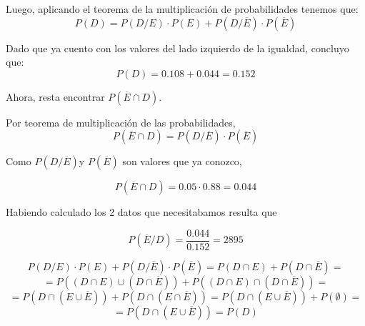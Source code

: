 \documentclass[11pt]{article}
\begin{document}
Luego, aplicando el teorema de la multiplicaci\'on de
probabilidades tenemos que: 
\[P(D) = P(D/E)\cdot P(E) + P(D/\overline{E}) \cdot P(\overline{E})\]

Dado que ya cuento con los valores del lado izquierdo de la igualdad, concluyo que: 
\[P(D) = 0.108 + 0.044 = 0.152\]

Ahora, resta encontrar $P(\overline{E}\cap D)$. 

Por teorema de multiplicaci\'on de las probabilidades, 
\[P(\overline{E}\cap D) = P(D/\overline{E})\cdot P(\overline{E})\]

Como $P(D/\overline{E})$y $P(\overline{E})$ son valores que ya conozco, 

\[P(\overline{E}\cap D) = 0.05 \cdot 0.88 = 0.044\] 

Habiendo calculado los 2 datos que necesitabamos resulta que 

\[P(\overline{E}/D) = \frac{0.044}{0.152} = 2895\]


$$P(D/E) \cdot P(E) + P(D/\overline{E}) \cdot P(\overline{E}) = P(D \cap E) + P(D \cap \overline{E}) = $$
$$ = P((D \cap E) \cup (D \cap \overline{E})) + P((D \cap E) \cap (D \cap \overline{E})) = $$
$$ = P(D \cap (E \cup \overline{E})) + P(D \cap (E \cap \overline{E})) = P(D \cap (E \cup \overline{E})) + P(\emptyset) = $$
$$ = P(D \cap (E \cup \overline{E})) = P(D) $$
\end{document}
